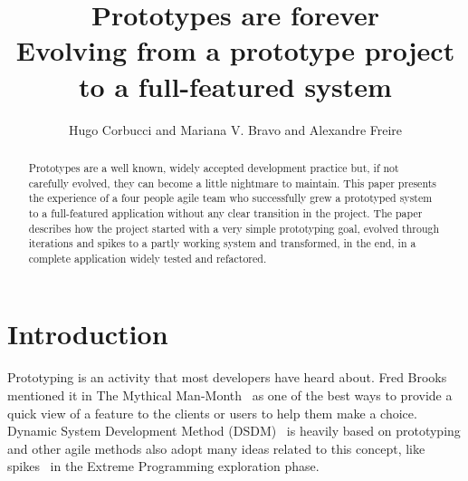 \documentclass[lnbip]{svmultln}
\begin{document}
%
\mainmatter %
%
\title{Prototypes are forever\\
  Evolving from a prototype project\\ to a full-featured system}
%
%
\author{Hugo Corbucci and Mariana V. Bravo  and
  Alexandre Freire}
%
%
%

\maketitle %

\begin{abstract} %
  Prototypes are a well known, widely accepted development practice
  but, if not carefully evolved, they can become a little nightmare to
  maintain. This paper presents the experience of a four people agile
  team who successfully grew a prototyped system to a
  full-featured application without any clear transition in the
  project. The paper describes how the project started with a very
  simple prototyping goal, evolved through iterations and spikes to a
  partly working system and transformed, in the end, in a complete
  application widely tested and refactored.

\end{abstract}
%
\section{Introduction}

Prototyping is an activity that most developers have heard about. Fred
Brooks mentioned it in The Mythical Man-Month~\cite{Brooks1975} as one
of the best ways to provide a quick view of a feature to the clients
or users to help them make a choice. Dynamic System Development Method
(DSDM)~\cite{DSDM} is heavily based on prototyping and other agile
methods also adopt many ideas related to this concept, like
spikes~\cite{XP} in the Extreme Programming exploration
phase.
\end{document}
